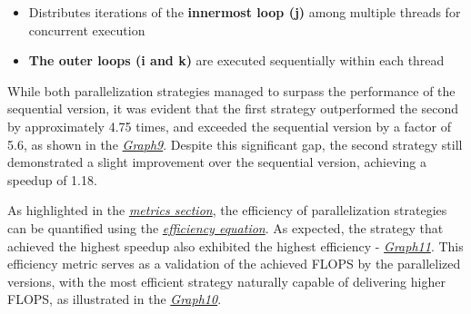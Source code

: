 \begin{itemize}
    \item Distributes iterations of the \textbf{innermost loop (j)} among multiple threads for concurrent execution
    \item \textbf{The outer loops (i and k)} are executed sequentially within each thread
\end{itemize}

\hspace*{1cm}

While both parallelization strategies managed to surpass the performance of the
sequential version, it was evident that the first strategy outperformed the second
by approximately 4.75 times, and exceeded the sequential version by a factor of 5.6,
as shown in the \textit{\hyperref[graph:BLG5]{Graph9}}. Despite this significant gap, the second strategy still 
demonstrated a slight improvement over the sequential version, achieving a speedup 
of 1.18.

As highlighted in the \textit{\hyperref[sec:metrics]{metrics section}}, the efficiency of parallelization strategies 
can be quantified using the \textit{\hyperref[eq:efficiency]{efficiency equation}}. 
As expected, the strategy that achieved the highest speedup also exhibited the highest 
efficiency - \textit{\hyperref[graph:BLG11]{Graph11}}. This efficiency metric serves as a 
validation of the achieved FLOPS by the parallelized versions, with the most 
efficient strategy naturally capable of delivering higher FLOPS, as illustrated 
in the \textit{\hyperref[graph:BLG10]{Graph10}}.